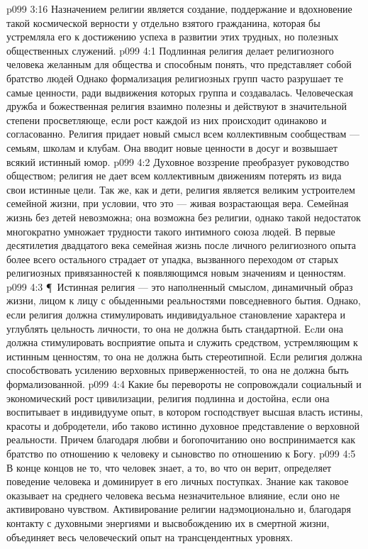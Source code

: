 \vs p099 3:16 Назначением религии является создание, поддержание и вдохновение такой космической верности у отдельно взятого гражданина, которая бы устремляла его к достижению успеха в развитии этих трудных, но полезных общественных служений.
\vs p099 4:1 Подлинная религия делает религиозного человека желанным для общества и способным понять, что представляет собой братство людей Однако формализация религиозных групп часто разрушает те самые ценности, ради выдвижения которых группа и создавалась. Человеческая дружба и божественная религия взаимно полезны и действуют в значительной степени просветляюще, если рост каждой из них происходит одинаково и согласованно. Религия придает новый смысл всем коллективным сообществам --- семьям, школам и клубам. Она вводит новые ценности в досуг и возвышает всякий истинный юмор.
\vs p099 4:2 Духовное воззрение преобразует руководство обществом; религия не дает всем коллективным движениям потерять из вида свои истинные цели. Так же, как и дети, религия является великим устроителем семейной жизни, при условии, что это --- живая возрастающая вера. Семейная жизнь без детей невозможна; она возможна без религии, однако такой недостаток многократно умножает трудности такого интимного союза людей. В первые десятилетия двадцатого века семейная жизнь после личного религиозного опыта более всего остального страдает от упадка, вызванного переходом от старых религиозных привязанностей к появляющимся новым значениям и ценностям.
\vs p099 4:3 \P\ Истинная религия --- это наполненный смыслом, динамичный образ жизни, лицом к лицу с обыденными реальностями повседневного бытия. Однако, если религия должна стимулировать индивидуальное становление характера и углублять цельность личности, то она не должна быть стандартной. Еcли она должна стимулировать восприятие опыта и служить средством, устремляющим к истинным ценностям, то она не должна быть стереотипной. Если религия должна способствовать усилению верховных приверженностей, то она не должна быть формализованной.
\vs p099 4:4 Какие бы перевороты не сопровождали социальный и экономический рост цивилизации, религия подлинна и достойна, если она воспитывает в индивидууме опыт, в котором господствует высшая власть истины, красоты и добродетели, ибо таково истинно духовное представление о верховной реальности. Причем благодаря любви и богопочитанию оно воспринимается как братство по отношению к человеку и сыновство по отношению к Богу.
\vs p099 4:5 В конце концов не то, что человек знает, а то, во что он верит, определяет поведение человека и доминирует в его личных поступках. Знание как таковое оказывает на среднего человека весьма незначительное влияние, если оно не активировано чувством. Активирование религии надэмоционально и, благодаря контакту с духовными энергиями и высвобождению их в смертной жизни, объединяет весь человеческий опыт на трансцендентных уровнях.

